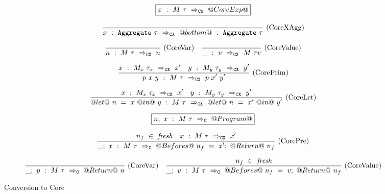 
\begin{figure*}

\newcommand \acc {\tau_\mathit{acc}}
\newcommand \xtr {\tau_\mathit{extract}}
\newcommand \lam[1] {\lambda{} #1.~}

$$
\boxed{x~:~M~\tau~\Rightarrow_{\mathtt{CX}}~@CoreExp@}
$$

$$
\frac {\displaystyle 
} {\displaystyle  
    x~:~\mathtt{Aggregate}~\tau~\Rightarrow_{\mathtt{CX}}~@bottom@~:~\mathtt{Aggregate}~\tau
} \ 
\textrm{(CoreXAgg)}
$$

$$
\frac {\displaystyle 
} {\displaystyle  
    n~:~M~\tau~\Rightarrow_{\mathtt{CX}}~n
} \ 
\textrm{(CoreVar)}
\quad
\frac {\displaystyle 
} {\displaystyle  
    \_~:~v~\Rightarrow_{\mathtt{CX}}~M~\tau{v}
} \ 
\textrm{(CoreValue)}
$$

$$
\frac {\displaystyle 
    x~:~M_x~\tau_x~\Rightarrow_{\mathtt{CX}}~x'
    \quad
    y~:~M_y~\tau_y~\Rightarrow_{\mathtt{CX}}~y'
} {\displaystyle  
    p~x~y~:~M~\tau~\Rightarrow_{\mathtt{CX}}~p~x'~y'
} \ 
\textrm{(CorePrim)}
$$

$$
\frac {\displaystyle 
    x~:~M_x~\tau_x~\Rightarrow_{\mathtt{CX}}~x'
    \quad
    y~:~M_y~\tau_y~\Rightarrow_{\mathtt{CX}}~y'
} {\displaystyle  
    @let@~n~=~x~@in@~y~:~M~\tau~\Rightarrow_{\mathtt{CX}}~@let@~n~=~x'~@in@~y'
} \ 
\textrm{(CoreLet)}
$$


$$
\boxed{n;~x~:~M~\tau~\Rightarrow_{\mathtt{C}}~@Program@}
$$


$$
\frac {\displaystyle 
    n_f~\in~\mathit{fresh}
    \quad
    x~:~M~\tau~\Rightarrow_{\mathtt{CX}}~x'
} {\displaystyle  
    \_;~x~:~M~\tau~\Rightarrow_{\mathtt{C}}~@Befores@~n_f~=~x';~@Return@~n_f
} \ 
\textrm{(CorePre)}
$$

$$
\frac {\displaystyle 
} {\displaystyle  
    \_;~p~:~M~\tau~\Rightarrow_{\mathtt{C}}~@Return@~n
} \ 
\textrm{(CoreVar)}
\quad
\frac {\displaystyle 
    n_f~\in~\mathit{fresh}
} {\displaystyle  
    \_;~v~:~M~\tau~\Rightarrow_{\mathtt{C}}~@Befores@~n_f~=~v;~@Return@~n_f
} \ 
\textrm{(CoreValue)}
$$



\caption{Conversion to Core}
\label{fig:core:compile}
\end{figure*}


